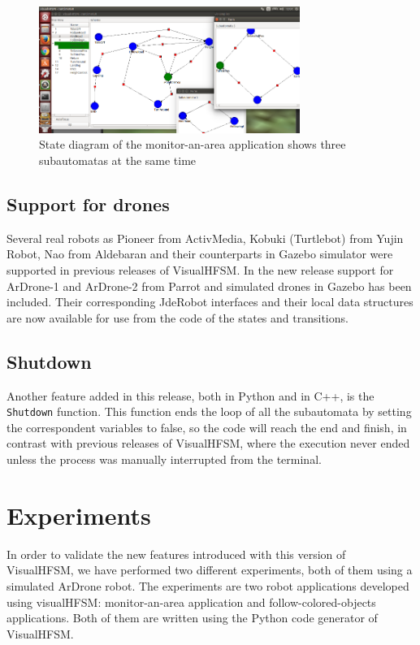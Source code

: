 \documentclass[journal,twoside]{JoPhA}
\begin{document}
\begin{figure}[ht!]
\begin{center}
        \includegraphics[width=8.5cm]{figs/runtime-hierarchy.png}
\end{center}
\caption{State diagram of the monitor-an-area application shows three subautomatas at the same time}
\label{fig:runtime-hierarchy}
\end{figure}

\subsection{Support for drones}

Several real robots as Pioneer from ActivMedia, Kobuki (Turtlebot) from Yujin Robot, Nao from Aldebaran and their counterparts in Gazebo simulator were supported in previous releases of VisualHFSM. In the new release support for ArDrone-1 and ArDrone-2 from Parrot and simulated drones in Gazebo has been included. Their corresponding JdeRobot interfaces and their local data structures are now available for use from the code of the states and transitions.

\subsection{Shutdown}

Another feature added in this release, both in Python and in C++, is the \texttt{Shutdown} function. This function ends the loop of all the subautomata by setting the correspondent variables to false, so the code will reach the end and finish, in contrast with previous releases of VisualHFSM, where the execution never ended unless the process was manually interrupted from the terminal.

\section{Experiments}

In order to validate the new features introduced with this version of VisualHFSM, we have performed two different experiments, both of them using a simulated ArDrone robot. The experiments are two robot applications developed using visualHFSM: monitor-an-area application and follow-colored-objects applications. Both of them are written using the Python code generator of VisualHFSM.
\end{document}
